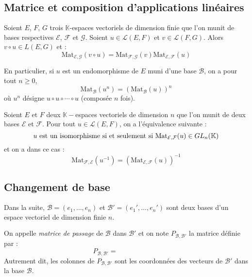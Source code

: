 \documentclass[a4paper,10pt]{report}
\begin{document}
\subsection{Matrice et composition d'applications linéaires}

\begin{prop}
Soient $E$, $F$, $G$ trois $\mathbb{K}$-espaces vectoriels de dimension finie que l'on munit de bases respectives $\mathcal{E}$, $\mathcal{F}$ et $\mathcal{G}$. Soient $u \in \mathcal{L}(E,F)$ et $v \in \mathcal{L}(F,G)$. Alors $v \circ u \in L(E,G)$ et :
$$ \textrm{Mat}_{\mathcal{E}, \mathcal{G}}(v \circ u) = \textrm{Mat}_{\mathcal{F}, \mathcal{G}}(v ) \textrm{Mat}_{\mathcal{E}, \mathcal{F}}( u)$$
\end{prop}

\begin{rem} En particulier, si $u$ est un endomorphisme de $E$ muni d'une base $\mathcal{B}$, on a pour tout $n \geq 0$,
$$ \textrm{Mat}_{\mathcal{B}}(u^n) = \left(\textrm{Mat}_{\mathcal{B}}(u)\right)^n$$
où $u^n$ désigne $u \circ u \circ \cdots \circ u$ (composée $n$ fois).
\end{rem}

\begin{cor} Soient $E$ et $F$ deux $\mathbb{K}-$espaces vectoriels  de dimension $n$ que l'on munit de deux bases $\mathcal{E}$ et $\mathcal{F}$. Pour tout $u \in \mathcal{L}(E,F)$, on a l'équivalence suivante :
$$ u \hbox{ est un isomorphisme si et seulement si } \textrm{Mat}_{\mathcal{E}, \mathcal{F}}(u) \in GL_n (\mathbb{K})$$
et on a dans ce cas :
$$ \textrm{Mat}_{\mathcal{F}, \mathcal{E}}(u^{-1}) = \left( \textrm{Mat}_{\mathcal{E}, \mathcal{F}}(u) \right)^{-1}$$
\end{cor}


\subsection{Changement de base}

\noindent Dans la suite, $\mathcal{B}=(e_1, \ldots, e_n)$ et $\mathcal{B}'= (e_1', \ldots,e_n')$ sont deux bases d'un espace vectoriel de dimension finie $n$.

\begin{defin} On appelle \textit{matrice de passage} de $\mathcal{B}$ dans $\mathcal{B}'$ et on note $P_{\mathcal{B}, \mathcal{B}'}$ la matrice définie par :
$$ P_{\mathcal{B}, \mathcal{B}'} = \phantom{\textrm{Mat}_{\mathcal{B}', \mathcal{B}}(\textrm{Id})}$$
Autrement dit, les colonnes de $P_{\mathcal{B}, \mathcal{B}'}$ sont les coordonnées des vecteurs de $\mathcal{B}'$ dans la base $\mathcal{B}$.
\end{defin}
\end{document}
